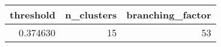 \begin{tabular}{rrr}
\toprule
threshold & n_clusters & branching_factor \\
\midrule
0.374630 & 15 & 53 \\
\bottomrule
\end{tabular}
